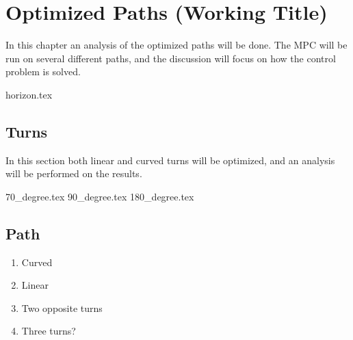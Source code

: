 \chapter{Optimized Paths (Working Title)}


In this chapter an analysis of the optimized paths will be done. The MPC will be run on several different paths, and the discussion will focus on how the control problem is solved.

{horizon.tex}

\section{Turns}

In this section both linear and curved turns will be optimized, and an analysis will be performed on the results.

{70_degree.tex}
{90_degree.tex}
{180_degree.tex}	


\section{Path}

\begin{enumerate}
	\item Curved
	\item Linear
	\item Two opposite turns
	\item Three turns?
\end{enumerate}


